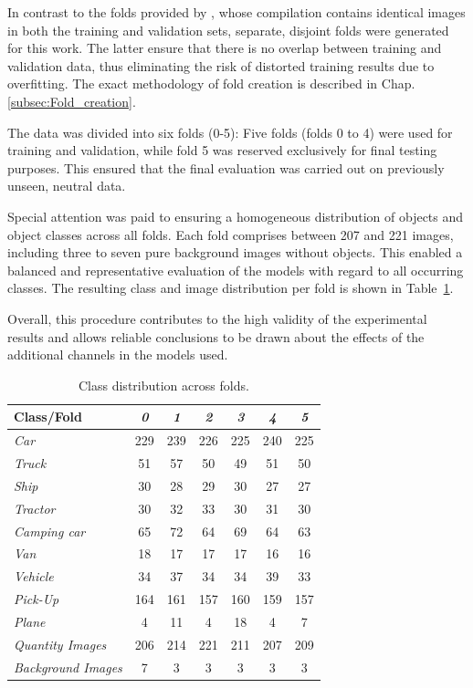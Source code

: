 In contrast to the folds provided by \citeauthor{Razakarivony2015} \cite{Razakarivony2015}, whose compilation contains identical images in both the training and validation sets, separate, disjoint folds were generated for this work. The latter ensure that there is no overlap between training and validation data, thus eliminating the risk of distorted training results due to overfitting. The exact methodology of fold creation is described in Chap. \ref{subsec:Fold_creation}.

The data was divided into six folds (0-5): Five folds (folds 0 to 4) were used for training and validation, while fold 5 was reserved exclusively for final testing purposes. This ensured that the final evaluation was carried out on previously unseen, neutral data.

Special attention was paid to ensuring a homogeneous distribution of objects and object classes across all folds. Each fold comprises between 207 and 221 images, including three to seven pure background images without objects. This enabled a balanced and representative evaluation of the models with regard to all occurring classes. The resulting class and image distribution per fold is shown in Table~\ref{tab:fold_distribution}.

Overall, this procedure contributes to the high validity of the experimental results and allows reliable conclusions to be drawn about the effects of the additional channels in the models used.


\begin{table}[h!]
\centering
\begin{tabular}{lcccccc}
\textbf{Class/Fold} & \textit{0} & \textit{1} & \textit{2} & \textit{3} & \textit{4} & \textit{5} \\
\hline
\textit{Car}              & 229 & 239 & 226 & 225 & 240 & 225 \\
\textit{Truck}            & 51  & 57  & 50  & 49  & 51  & 50  \\
\textit{Ship}             & 30  & 28  & 29  & 30  & 27  & 27  \\
\textit{Tractor}          & 30  & 32  & 33  & 30  & 31  & 30  \\
\textit{Camping car}      & 65  & 72  & 64  & 69  & 64  & 63  \\
\textit{Van}              & 18  & 17  & 17  & 17  & 16  & 16  \\
\textit{Vehicle}          & 34  & 37  & 34  & 34  & 39  & 33  \\
\textit{Pick-Up}          & 164 & 161 & 157 & 160 & 159 & 157 \\
\textit{Plane}            & 4   & 11  & 4   & 18  & 4   & 7   \\
\textit{Quantity Images}  & 206 & 214 & 221 & 211 & 207 & 209 \\
\textit{Background Images}& 7   & 3   & 3   & 3   & 3   & 3   \\
\hline
\end{tabular}
\caption{Class distribution across folds.}
\label{tab:fold_distribution}
\end{table}



